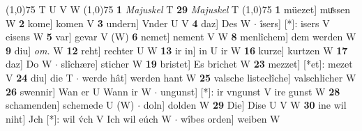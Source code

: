 \documentclass[8pt,a4paper,notitlepage]{article}
\begin{document}
\begin{table}[ht]
\begin{minipage}[t]{0.5\linewidth}
\scriptsize
\line(1,0){75} \newline
T U V W \newline
\line(1,0){75} \newline
\textbf{1} \textit{Majuskel} T  \textbf{29} \textit{Majuskel} T  \newline
\line(1,0){75} \newline
\textbf{1} müezet] muͤssen W \textbf{2} kome] komen V \textbf{3} undern] Vnder U V \textbf{4} daz] Des W  $\cdot$ îsers] [*]: isers V eisens W \textbf{5} var] gevar V (W) \textbf{6} nemet] nement V W \textbf{8} menlîchem] dem werden W \textbf{9} diu] \textit{om.} W \textbf{12} reht] rechter U W \textbf{13} ir in] in U ir W \textbf{16} kurze] kurtzen W \textbf{17} daz] Do W  $\cdot$ slîchære] sticher W \textbf{19} bristet] Es brichet W \textbf{23} mezzet] [*et]: mezet V \textbf{24} diu] die T  $\cdot$ werde hât] werden hant W \textbf{25} valsche listeclîche] valschlicher W \textbf{26} swennir] Wan er U Wann ir W  $\cdot$ ungunst] [*]: ir vngunst V ire gunst W \textbf{28} schamenden] schemede U (W)  $\cdot$ doln] dolden W \textbf{29} Die] Dise U V W \textbf{30} ine wil niht] Jch [*]: wil v́ch V Ich wil eúch W  $\cdot$ wîbes orden] weiben W \newline
\end{minipage}
\end{table}
\end{document}
